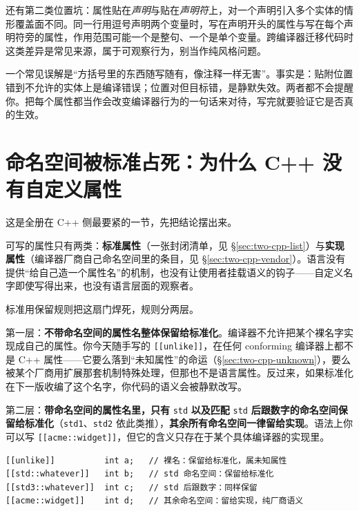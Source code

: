 \documentclass[12pt,a4paper,fontset=fandol]{ctexbook}
\newcommand{\cpplabel}{%
  \tcbox[on line,colback=cppheadbg,colframe=cppheadbg,
    boxrule=0pt,arc=1pt,left=2pt,right=2pt,top=1pt,bottom=1pt,
    colupper=white,fontupper=\scriptsize\bfseries]{C++}}
\newcommand{\cpp}[1]{C++#1}
\begin{document}
还有第二类位置坑：属性贴在\emph{声明}与贴在\emph{声明符}上，对一个声明引入多个实体的情形覆盖面不同。同一行用逗号声明两个变量时，写在声明开头的属性与写在每个声明符旁的属性，作用范围可能一个是整句、一个是单个变量。跨编译器迁移代码时这类差异是常见来源，属于可观察行为，别当作纯风格问题。

\begin{note}[title={属性不是注释，也不是标记语言}]
一个常见误解是“方括号里的东西随写随有，像注释一样无害”。事实是：贴附位置错到不允许的实体上是编译错误；位置对但目标错，是静默失效。两者都不会提醒你。把每个属性都当作会改变编译器行为的一句话来对待，写完就要验证它是否真的生效。
\end{note}

\section{命名空间被标准占死：为什么 C++ 没有自定义属性}
\label{sec:two-cpp-reserved}

这是全册在 C++ 侧最要紧的一节，先把结论摆出来。

\begin{guideline}[title={截至 \cpp{26}，C++ 没有用户自定义属性}]
可写的属性只有两类：\textbf{标准属性}（一张封闭清单，见 \S\ref{sec:two-cpp-list}）与\textbf{实现属性}（编译器厂商自己命名空间里的条目，见 \S\ref{sec:two-cpp-vendor}）。语言没有提供“给自己造一个属性名”的机制，也没有让使用者挂载语义的钩子——自定义名字即使写得出来，也没有语言层面的观察者。
\end{guideline}

标准用保留规则把这扇门焊死，规则分两层。

第一层：\textbf{不带命名空间的属性名整体保留给标准化}。编译器不允许把某个裸名字实现成自己的属性。你今天随手写的 \texttt{[[unlike]]}，在任何 conforming 编译器上都不是 C++ 属性——它要么落到“未知属性”的命运（\S\ref{sec:two-cpp-unknown}），要么被某个厂商用扩展那套机制特殊处理，但那也不是语言属性。反过来，如果标准化在下一版收编了这个名字，你代码的语义会被静默改写。

第二层：\textbf{带命名空间的属性名里，只有 } \texttt{std} \textbf{以及匹配 } \texttt{std} \textbf{后跟数字的命名空间保留给标准化}（\texttt{std1}、\texttt{std2} 依此类推），\textbf{其余所有命名空间一律留给实现}。语法上你可以写 \texttt{[[acme::widget]]}，但它的含义只存在于某个具体编译器的实现里。

\cpplabel{}
\begin{lstlisting}[style=cppstyle, caption={“写得出来”不等于“是语言特性”}, label={lst:ch2-cpp-reserved}]
[[unlike]]          int a;   // 裸名：保留给标准化，属未知属性
[[std::whatever]]   int b;   // std 命名空间：保留给标准化
[[std3::whatever]]  int c;   // std 后跟数字：同样保留
[[acme::widget]]    int d;   // 其余命名空间：留给实现，纯厂商语义
\end{lstlisting}
\end{document}
